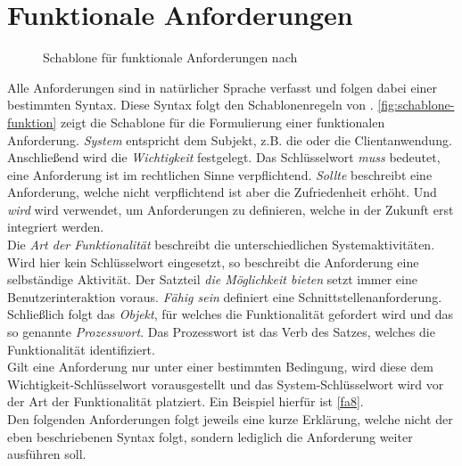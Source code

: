 \section{Funktionale Anforderungen}
\label{sec:funktionale}

\begin{figure}
    \centering
    
    \caption{Schablone für funktionale Anforderungen nach }
    \label{fig:schablone-funktion}
\end{figure}

Alle Anforderungen sind in natürlicher Sprache verfasst und folgen dabei einer bestimmten Syntax. Diese
Syntax folgt den Schablonenregeln von . \autoref{fig:schablone-funktion} zeigt die
Schablone für die Formulierung einer funktionalen Anforderung. \emph{System} entspricht dem 
Subjekt, z.B. die \shst{} oder die Clientanwendung. Anschließend wird die \emph{Wichtigkeit} festgelegt. 
Das Schlüsselwort \emph{muss} bedeutet, eine Anforderung ist im rechtlichen Sinne verpflichtend. \emph{Sollte} 
beschreibt eine Anforderung, welche nicht verpflichtend ist aber die Zufriedenheit erhöht. Und \emph{wird}
wird verwendet, um Anforderungen zu definieren, welche in der Zukunft erst integriert werden.\\
Die \emph{Art der Funktionalität} beschreibt die unterschiedlichen Systemaktivitäten. Wird hier kein Schlüsselwort
eingesetzt, so beschreibt die Anforderung eine selbständige Aktivität. Der Satzteil \emph{die Möglichkeit bieten}
setzt immer eine Benutzerinteraktion voraus. \emph{Fähig sein} definiert eine Schnittstellenanforderung.\\
Schließlich folgt das \emph{Objekt}, für welches die Funktionalität gefordert wird und das so genannte \emph{Prozesswort}. Das
Prozesswort ist das Verb des Satzes, welches die Funktionalität identifiziert.\\
Gilt eine Anforderung nur unter einer bestimmten Bedingung, wird diese dem Wichtigkeit-Schlüsselwort vorausgestellt und
das System-Schlüsselwort wird vor der Art der Funktionalität platziert. Ein Beispiel hierfür ist \ref{fa8}.\\

Den folgenden Anforderungen folgt jeweils eine kurze Erklärung, welche nicht der eben beschriebenen Syntax folgt,
sondern lediglich die Anforderung weiter ausführen soll. 

